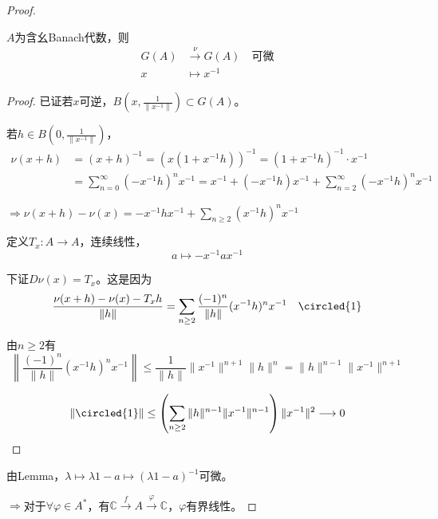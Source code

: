 \documentclass[lang=cn,a4paper,newtx,section]{elegantbook}
\begin{document}
\begin{proof}
\begin{lemma}
  $A$为含幺Banach代数，则
  \begin{equation*}
    \begin{aligned}
      G(A) &\xrightarrow{\nu} G(A) \quad \text{可微} \\
      x &\longmapsto x^{-1}
    \end{aligned}
  \end{equation*}
\end{lemma}

\begin{proof}
  已证若$x$可逆，$B(x, \frac{1}{\|x^{-1}\|}) \subset G(A)$。
  
  若$h \in B(0, \frac{1}{\|x^{-1}\|})$，
  \begin{align*}
    \nu(x+h) &= (x+h)^{-1} = (x(1 + x^{-1}h))^{-1} = (1 + x^{-1}h)^{-1} \cdot x^{-1} \\
    &= \sum_{n=0}^{\infty}(-x^{-1}h)^n x^{-1} = x^{-1} + (-x^{-1}h)x^{-1} + \sum_{n=2}^{\infty}(-x^{-1}h)^n x^{-1}
  \end{align*}
  
  $\Rightarrow \nu(x+h) - \nu(x) = -x^{-1}hx^{-1} + \sum_{n \geq 2}(x^{-1}h)^n x^{-1}$
  
  定义$T_x: A \longrightarrow A$，连续线性，
  \begin{equation*}
    a \longmapsto -x^{-1}ax^{-1}
  \end{equation*}
  
  下证$D\nu(x) = T_x$。这是因为
  \begin{equation*}
    \frac{\nu(x+h) - \nu(x) - T_x h}{\|h\|} = \sum_{n \geq 2}\frac{(-1)^n}{\|h\|}(x^{-1}h)^n x^{-1} \quad \circled{1}
  \end{equation*}
  
  由$n \geq 2$有
  \begin{equation*}
    \left\|\frac{(-1)^n}{\|h\|}(x^{-1}h)^n x^{-1}\right\| \leq \frac{1}{\|h\|}\|x^{-1}\|^{n+1}\|h\|^n = \|h\|^{n-1}\|x^{-1}\|^{n+1}
  \end{equation*}
  
  \begin{equation*}
    \|\circled{1}\| \leq \left(\sum_{n \geq 2}\|h\|^{n-1}\|x^{-1}\|^{n-1}\right)\|x^{-1}\|^2 \longrightarrow 0
  \end{equation*}
\end{proof}
  由Lemma，$\lambda \longmapsto \lambda 1 - a \longmapsto (\lambda 1 - a)^{-1}$可微。
  
  $\Rightarrow$对于$\forall \varphi \in A^*$，有$\mathbb{C} \xrightarrow{f} A \xrightarrow{\varphi} \mathbb{C}$，$\varphi$有界线性。
  

\end{proof}
\end{document}
